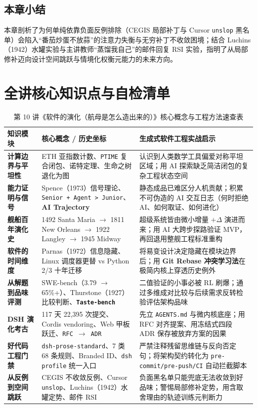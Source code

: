 \documentclass[a4paper]{article}
\begin{document}
\subsection{本章小结}

本章剖析了为何单纯依靠负面反例排除（CEGIS 局部补丁与 Cursor \texttt{unslop} 黑名单）会陷入“番茄炒蛋不放蒜”的注意力失衡与无穷补丁不收敛困境；结合 Luchins（1942）水罐实验与主讲教师“蒸馏我自己”的邮件回复 RSI 实验，指明了从局部修补迈向设计空间跳跃与情境化权衡元能力的未来方向。

\newpage
\section*{全讲核心知识点与自检清单}

\begin{table}[H]
\centering
\small
\caption{第 10 讲《软件的演化（航母是怎么造出来的）》核心概念与工程方法速查表}
\begin{tabular}{p{3.0cm}p{4.5cm}p{5.8cm}}
\toprule
\textbf{知识模块} & \textbf{核心概念 / 历史坐标} & \textbf{生成式软件工程实战启示} \\
\midrule
\textbf{计算边界与平坦性} & ETH 亚指数计数、\texttt{PTIME} 复合闭包、诺特定理、生命之树退化为图 & 认识到人类数学工具偏爱对称平坦区域；用 AI 探索缺乏简洁闭包的复杂工程状态空间 \\
\textbf{能力证明与信号} & Spence（1973）信号理论、\texttt{Senior + Agent > Junior}、\textbf{AI Trajectory} & 静态成品已难区分人机贡献；积累不可伪造的 AI 交互日志（何时拒绝 AI、如何取证、如何进化） \\
\textbf{舰船百年演化史} & 1492 Santa Maria $\to$ 1811 New Orleans $\to$ 1922 Langley $\to$ 1945 Midway & 超级系统皆由微小增量 $+\Delta$ 演进而来；用 AI 大跨步探路验证 MVP，再回退用整舰工程标准重构 \\
\textbf{软件的时间维度} & Parnas（1972）信息隐藏、Linux 调度器更替 vs Python 2/3 十年迁移 & 将易变设计决定隐藏在模块边界后；用 \textbf{Git Rebase 冲突学习法}在极简内核上穿透历史例外 \\
\textbf{从解题到品味评测} & SWE-bench（3.79 $\to$ 65\%+）、Thurstone（1927）比较判断、\textbf{\texttt{Taste-bench}} & 二值验证的小事必被 RL 刷爆；通过多维成对比较与后续需求反转检验评估架构品味 \\
\textbf{DSH 演化考古} & 117 天 22,395 次提交、Cordis vendoring、Web 甲板跃迁、\texttt{RFC $\to$ ADR} & 先立 \texttt{AGENTS.md} 与微内核底座；用 RFC 对齐提案、用冻结式四段 ADR 保存被放弃方案的因果 \\
\textbf{好代码工程门禁} & \texttt{dsh-prose-standard}、7 类 68 条规则、Branded ID、\texttt{dsh profile} 统一入口 & 严禁注释残留思维链与反向否定句；将架构契约转化为 \texttt{pre-commit/pre-push/CI} 自动拦截脚本 \\
\textbf{从反例到空间跳跃} & CEGIS 不收敛反例、Cursor \texttt{unslop}、Luchins（1942）水罐定势、邮件 RSI & 负面黑名单只能兜底无法收敛到好品味；警惕局部修补定势，用含取舍理由的轨迹训练元判断力 \\
\bottomrule
\end{tabular}
\end{table}
\end{document}

